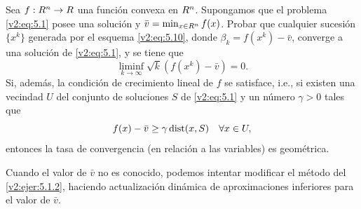 \begin{exercise}\label{v2:ejer:5.1.2}
    Sea $f : R^n \to R$ una función convexa en $R^n$. Supongamos que el problema \eqref{v2:eq:5.1} posee una solución y $\bar{v} = \min_{x \in R^n} f(x)$. Probar que cualquier sucesión $\{x^k\}$ generada por el esquema \eqref{v2:eq:5.10}, donde $\beta_k = f(x^k) - \bar{v}$, converge a una solución de \eqref{v2:eq:5.1}, y se tiene que
    \[
        \liminf_{k \to \infty} \sqrt{k} (f(x^k) - \bar{v}) = 0.
    \]
    Si, además, la condición de crecimiento lineal de $f$ se satisface, i.e., si existen una vecindad $U$ del conjunto de soluciones $S$ de \eqref{v2:eq:5.1} y un número $\gamma > 0$ tales que
    \[
        f(x) - \bar{v} \ge \gamma \operatorname{dist}(x, S) \quad \forall x \in U,
    \]
    entonces la tasa de convergencia (en relación a las variables) es geométrica.
\end{exercise}

Cuando el valor de $\bar{v}$ no es conocido, podemos intentar modificar el método del \cref{v2:ejer:5.1.2}, haciendo actualización dinámica de aproximaciones inferiores para el valor de $\bar{v}$.